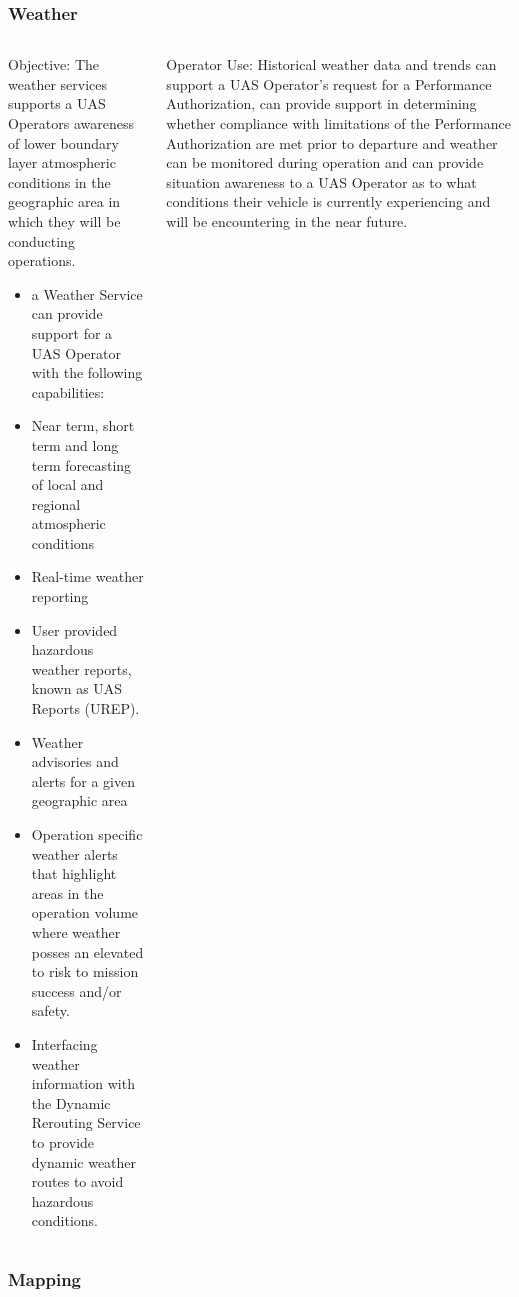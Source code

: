 \documentclass[usenames,dvipsnames,aspectratio=169,serif]{beamer}
\begin{document}
\begin{frame}
   \frametitle{Weather}
   \begin{columns}[t]
      \begin{column}{0.5\textwidth}
         Objective: The weather services supports a UAS Operators awareness of lower boundary layer atmospheric conditions in the geographic area in which they will be conducting operations.
         \begin{itemize}
         \item  a Weather Service can provide support for a UAS Operator with the following capabilities:
         \item  Near term, short term and long term forecasting of local and regional atmospheric conditions
         \item  Real-time weather reporting
         \item  User provided hazardous weather reports, known as UAS Reports (UREP).
         \item  Weather advisories and alerts for a given geographic area
         \item  Operation specific weather alerts that highlight areas in the operation volume where weather posses an elevated to risk to mission success and/or safety.
         \item  Interfacing weather information with the Dynamic Rerouting Service to provide dynamic weather routes to avoid hazardous conditions.
         \end{itemize}
      \end{column}
      \begin{column}{0.5\textwidth}
         Operator Use:
         Historical weather data and trends can support a UAS Operator’s request for a Performance Authorization, can provide support in determining whether compliance with limitations of the Performance Authorization are met prior to departure and weather can be monitored during operation and can provide situation awareness to a UAS Operator as to what conditions their vehicle is currently experiencing and will be encountering in the near future.
      \end{column}
   \end{columns}
\end{frame}

\begin{frame}
   \frametitle{Mapping}
   \begin{columns}[t]
      \begin{column}{0.5\textwidth}
      \end{column}
      \begin{column}{0.5\textwidth}
      \end{column}
   \end{columns}
\end{frame}
\end{document}
